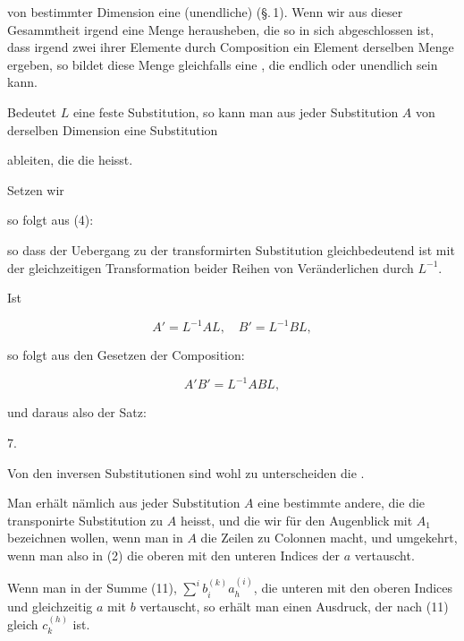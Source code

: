 von bestimmter Dimension eine (unendliche)  (\S.\,1). Wenn wir aus dieser Gesammtheit irgend eine Menge herausheben, die so in sich abgeschlossen ist, dass irgend zwei ihrer Elemente durch Composition ein Element derselben Menge ergeben, so bildet diese Menge gleichfalls eine , die endlich oder unendlich sein kann.

Bedeutet $L$ eine feste Substitution, so kann man aus jeder Substitution $A$ von derselben Dimension eine Substitution


ableiten, die die  heisst.

Setzen wir


so folgt aus (4):


so dass der Uebergang zu der transformirten Substitution gleichbedeutend ist mit der gleichzeitigen Transformation beider Reihen von Veränderlichen durch $L^{-1}$.

Ist

\[
A' = L^{-1}AL, \quad B' = L^{-1}BL,
\]

so folgt aus den Gesetzen der Composition:

\[
A'B' = L^{-1}ABL,
\]

und daraus also der Satz:

\par
7.\enspace{}

Von den inversen Substitutionen sind wohl zu unterscheiden die .

Man erhält nämlich aus jeder Substitution $A$ eine bestimmte andere, die die transponirte Substitution zu $A$ heisst, und die wir für den Augenblick mit $A_1$ bezeichnen wollen, wenn man in $A$ die Zeilen zu Colonnen macht, und umgekehrt, wenn man also in (2) die oberen mit den unteren Indices der $a$ vertauscht.

Wenn man in der Summe (11), $\sum^i b_i^{(k)} a_h^{(i)}$, die unteren mit den oberen Indices und gleichzeitig $a$ mit $b$ vertauscht, so erhält man einen Ausdruck, der nach (11) gleich $c_k^{(h)}$ ist.
